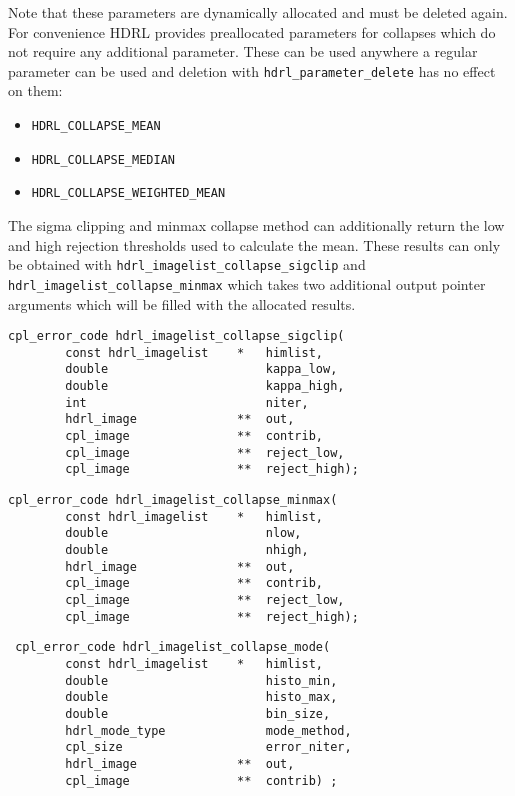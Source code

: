 Note that these parameters are dynamically allocated and must be deleted again.
For convenience HDRL provides preallocated parameters for collapses which do
not require any additional parameter. These can be used anywhere a regular
parameter can be used and deletion with \verb+hdrl_parameter_delete+ has no
effect on them:

\begin{itemize}
\item \verb+HDRL_COLLAPSE_MEAN+
\item \verb+HDRL_COLLAPSE_MEDIAN+
\item \verb+HDRL_COLLAPSE_WEIGHTED_MEAN+
\end{itemize}


The sigma clipping and minmax collapse method can additionally return
the low and high rejection thresholds used to calculate the
mean. These results can only be obtained with
\verb+hdrl_imagelist_collapse_sigclip+ and
\verb+hdrl_imagelist_collapse_minmax+ which takes two additional
output pointer arguments which will be filled with the allocated
results.

\begin{lstlisting}
cpl_error_code hdrl_imagelist_collapse_sigclip(
        const hdrl_imagelist    *   himlist,
        double                      kappa_low,
        double                      kappa_high,
        int                         niter,
        hdrl_image              **  out,
        cpl_image               **  contrib,
        cpl_image               **  reject_low,
        cpl_image               **  reject_high);
\end{lstlisting}

\begin{lstlisting}
cpl_error_code hdrl_imagelist_collapse_minmax(
        const hdrl_imagelist    *   himlist,
        double                      nlow,
        double                      nhigh,
        hdrl_image              **  out,
        cpl_image               **  contrib,
        cpl_image               **  reject_low,
        cpl_image               **  reject_high);
\end{lstlisting}

\begin{lstlisting}
 cpl_error_code hdrl_imagelist_collapse_mode(
        const hdrl_imagelist    *   himlist,
        double                      histo_min,
        double                      histo_max,
        double                      bin_size,
        hdrl_mode_type              mode_method,
        cpl_size                    error_niter,
        hdrl_image              **  out,
        cpl_image               **  contrib) ;
\end{lstlisting}                  

